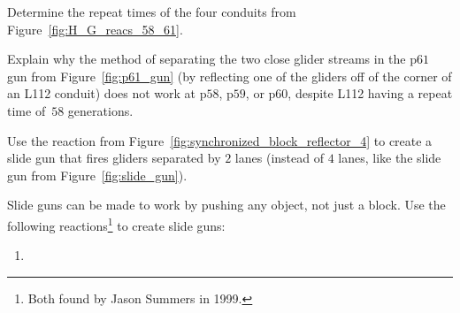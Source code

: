 \begin{multicols}{2}
	
	\mfilbreak
	
	
	\begin{problem}\label{exer:H_G_reacs_58_61}
		Determine the repeat times of the four conduits from Figure~\ref{fig:H_G_reacs_58_61}.
	\end{problem}
	
	
	\mfilbreak
	
	
	\begin{problem}\label{exer:p61_gun_reflection_no_60}
		Explain why the method of separating the two close glider streams in the p$61$ gun from Figure~\ref{fig:p61_gun} (by reflecting one of the gliders off of the corner of an L112 conduit) does not work at p$58$, p$59$, or p$60$, despite L112 having a repeat time of~$58$ generations.
	\end{problem}
	
	
	\mfilbreak
	
	
	\begin{problem}\label{exer:2_lane_slide_gun}
		Use the reaction from Figure~\ref{fig:synchronized_block_reflector_4} to create a slide gun that fires gliders separated by $2$ lanes (instead of $4$ lanes, like the slide gun from Figure~\ref{fig:slide_gun}).
	\end{problem}
	
	
	\mfilbreak
	
	
	\begin{problem}\label{exer:slide_gun_honey_farm}
		Slide guns can be made to work by pushing any object, not just a block. Use the following reactions\footnote{Both found by Jason Summers in 1999.} to create slide guns:\\[0.05cm]
		
		\begin{enumerate}[label=\bf\color{ocre}(\alph*)]
			\item {}\\[0.1cm]
			

\end{enumerate}
\end{problem}
\end{multicols}
